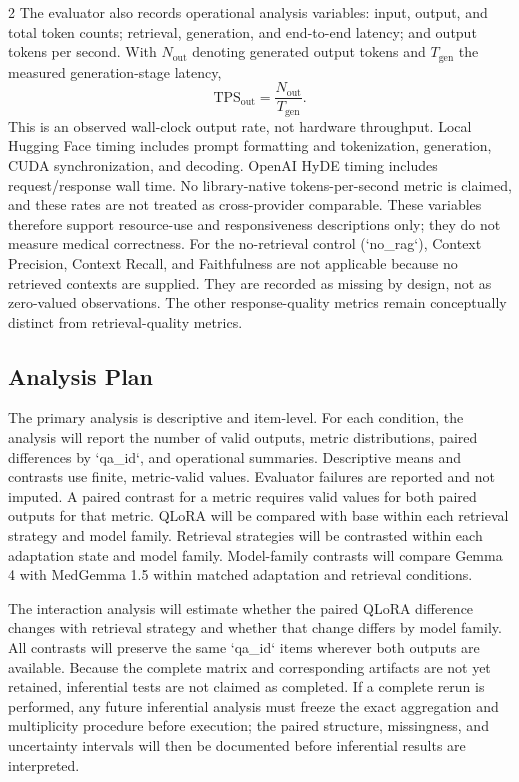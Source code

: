 \documentclass[11pt]{article}
\begin{document}
\begin{multicols}{2}
The evaluator also records operational analysis variables: input, output, and total token counts; retrieval, generation, and end-to-end latency; and output tokens per second. With $N_{\mathrm{out}}$ denoting generated output tokens and $T_{\mathrm{gen}}$ the measured generation-stage latency,
    \[
      \mathrm{TPS}_{\mathrm{out}}=\frac{N_{\mathrm{out}}}{T_{\mathrm{gen}}}.
    \]
    This is an observed wall-clock output rate, not hardware throughput. Local Hugging Face timing includes prompt formatting and tokenization, generation, CUDA synchronization, and decoding. OpenAI HyDE timing includes request/response wall time. No library-native tokens-per-second metric is claimed, and these rates are not treated as cross-provider comparable. These variables therefore support resource-use and responsiveness descriptions only; they do not measure medical correctness. For the no-retrieval control (`no\_rag`), Context Precision, Context Recall, and Faithfulness are not applicable because no retrieved contexts are supplied. They are recorded as missing by design, not as zero-valued observations. The other response-quality metrics remain conceptually distinct from retrieval-quality metrics.

\subsection{Analysis Plan}

The primary analysis is descriptive and item-level. For each condition, the analysis will report the number of valid outputs, metric distributions, paired differences by `qa\_id`, and operational summaries. Descriptive means and contrasts use finite, metric-valid values. Evaluator failures are reported and not imputed. A paired contrast for a metric requires valid values for both paired outputs for that metric. QLoRA will be compared with base within each retrieval strategy and model family. Retrieval strategies will be contrasted within each adaptation state and model family. Model-family contrasts will compare Gemma 4 with MedGemma 1.5 within matched adaptation and retrieval conditions.

The interaction analysis will estimate whether the paired QLoRA difference changes with retrieval strategy and whether that change differs by model family. All contrasts will preserve the same `qa\_id` items wherever both outputs are available. Because the complete matrix and corresponding artifacts are not yet retained, inferential tests are not claimed as completed. If a complete rerun is performed, any future inferential analysis must freeze the exact aggregation and multiplicity procedure before execution; the paired structure, missingness, and uncertainty intervals will then be documented before inferential results are interpreted.


\end{multicols}
\end{document}
